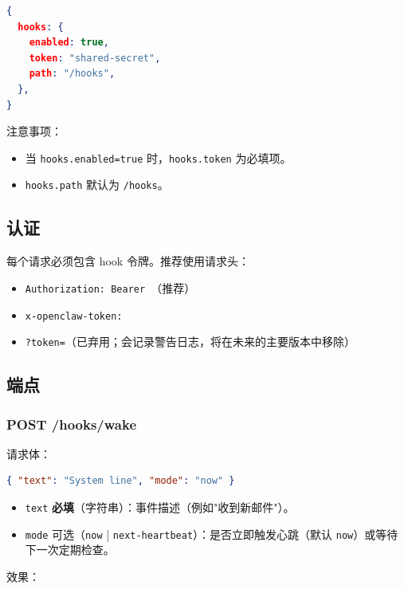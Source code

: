 \begin{lstlisting}[language=json]
{
  hooks: {
    enabled: true,
    token: "shared-secret",
    path: "/hooks",
  },
}
\end{lstlisting}


注意事项：

\begin{itemize}
  \item 当 \texttt{hooks.enabled=true} 时，\texttt{hooks.token} 为必填项。
  \item \texttt{hooks.path} 默认为 \texttt{/hooks}。
\end{itemize}


\subsection{认证}


每个请求必须包含 hook 令牌。推荐使用请求头：

\begin{itemize}
  \item \texttt{Authorization: Bearer }（推荐）
  \item \texttt{x-openclaw-token: }
  \item \texttt{?token=}（已弃用；会记录警告日志，将在未来的主要版本中移除）
\end{itemize}


\subsection{端点}


\subsubsection{POST /hooks/wake}


请求体：

\begin{lstlisting}[language=json]
{ "text": "System line", "mode": "now" }
\end{lstlisting}


\begin{itemize}
  \item \texttt{text} \textbf{必填}（字符串）：事件描述（例如"收到新邮件"）。
  \item \texttt{mode} 可选（\texttt{now} | \texttt{next-heartbeat}）：是否立即触发心跳（默认 \texttt{now}）或等待下一次定期检查。
\end{itemize}


效果：

